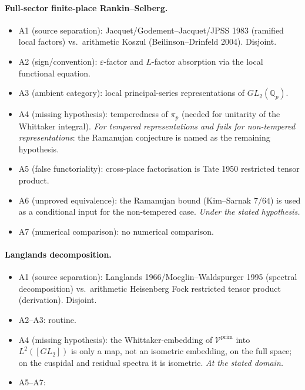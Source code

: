 \paragraph{Full-sector finite-place Rankin--Selberg.}
\begin{itemize}
\item A1 (source separation): Jacquet/Godement--Jacquet/JPSS 1983
(ramified local factors) vs.~arithmetic Koszul (Beilinson--Drinfeld
2004). Disjoint.
\item A2 (sign/convention): \(\varepsilon\)-factor and \(L\)-factor
absorption via the local functional equation.
\item A3 (ambient category): local principal-series representations
of \(GL_{2}(\mathbb{Q}_{p})\).
\item A4 (missing hypothesis): temperedness of \(\pi_{p}\) (needed
for unitarity of the Whittaker integral). \emph{For tempered representations and fails for non-tempered representations}: the Ramanujan conjecture is named as the
remaining hypothesis.
\item A5 (false functoriality): cross-place factorisation is Tate
1950 restricted tensor product.
\item A6 (unproved equivalence): the Ramanujan bound (Kim--Sarnak
\(7/64\)) is used as a conditional input for the non-tempered case.
\emph{Under the stated hypothesis.}
\item A7 (numerical comparison): no numerical comparison.
\end{itemize}

\paragraph{Langlands decomposition.}
\begin{itemize}
\item A1 (source separation): Langlands 1966/Moeglin--Waldspurger
1995 (spectral decomposition) vs.~arithmetic Heisenberg Fock restricted tensor
product (derivation). Disjoint.
\item A2--A3: routine.
\item A4 (missing hypothesis): the Whittaker-embedding of
\(\mathcal{V}^{\mathrm{prim}}\) into \(L^{2}([GL_{2}])\) is only a map,
not an isometric embedding, on the full space; on the cuspidal and
residual spectra it is isometric. \emph{At the stated domain.}
\item A5--A7:
\end{itemize}

